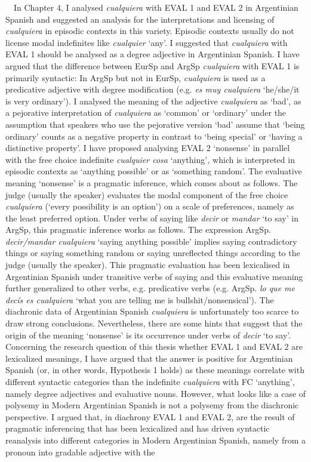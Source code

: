\begin{styleStandard}
\ \ In Chapter 4, I analysed \textit{cualquiera} with EVAL 1 and EVAL 2 in Argentinian Spanish and suggested an analysis for the interpretations and licensing of \textit{cualquiera} in episodic contexts in this variety. Episodic contexts usually do not license modal indefinites like \textit{cualquier} ‘any’. I suggested that \textit{cualquiera} with EVAL 1 should be analysed as a degree adjective in Argentinian Spanish. I have argued that the difference between EurSp and ArgSp \textit{cualquiera} with EVAL 1 is primarily syntactic: In ArgSp but not in EurSp, \textit{cualquiera} is used as a predicative adjective with degree modification (e.g. \textit{es muy cualquiera} ‘he/she/it is very ordinary’). I analysed the meaning of the adjective \textit{cualquiera} as ‘bad’, as a pejorative interpretation of \textit{cualquiera} as ‘common’ or ‘ordinary’ under the assumption that speakers who use the pejorative version ‘bad’ assume that ‘being ordinary’ counts as a negative property in contrast to ‘being special’ or ‘having a distinctive property’. I have proposed analysing EVAL 2 ‘nonsense’ in parallel with the free choice indefinite\textit{ cualquier cosa }‘anything’\textit{, }which is interpreted in episodic contexts as ‘anything possible’ or as ‘something random’. The evaluative meaning ‘nonsense’ is a pragmatic inference, which comes about as follows. The judge (usually the speaker) evaluates the modal component of the free choice \textit{cualquiera} (‘every possibility is an option’) on a scale of preferences, namely as the least preferred option. Under verbs of saying like \textit{decir} or \textit{mandar} ‘to say’ in ArgSp, this pragmatic inference works as follows. The expression ArgSp. \textit{decir/mandar cualquiera} ‘saying anything possible’ implies saying contradictory things or saying something random or saying unreflected things according to the judge (usually the speaker). This pragmatic evaluation has been lexicalised in Argentinian Spanish under transitive verbs of saying and this evaluative meaning further generalized to other verbs, e.g. predicative verbs (e.g. ArgSp. \textit{lo que me decís es cualquiera} ‘what you are telling me is bullshit/nonsensical’). The diachronic data of Argentinian Spanish \textit{cualquiera} is unfortunately too scarce to draw strong conclusions. Nevertheless, there are some hints that suggest that the origin of the meaning ‘nonsense’ is its occurrence under verbs of \textit{decir} ‘to say’. Concerning the research question of this thesis whether EVAL 1 and EVAL 2 are lexicalized meanings\textit{, }I have argued that the answer is positive for Argentinian Spanish (or, in other words, Hypothesis 1 holds) as these meanings correlate with different syntactic categories than the indefinite \textit{cualquiera} with FC ‘anything’, namely degree adjectives and evaluative nouns. However, what looks like a case of polysemy in Modern Argentinian Spanish is not a polysemy from the diachronic perspective. I argued that, in diachrony EVAL 1 and EVAL 2, are the result of pragmatic inferencing that has been lexicalized and has driven syntactic reanalysis into different categories in Modern Argentinian Spanish, namely from a pronoun into gradable adjective with the 
\end{styleStandard}
